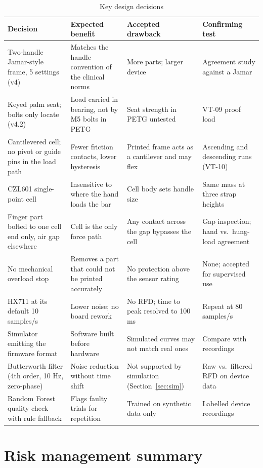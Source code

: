 \documentclass[10pt,a4paper]{article}
\begin{document}
\begin{table}[H]
\centering\small
\caption{Key design decisions}
\begin{tabularx}{\linewidth}{@{}P{3.9cm}LLP{3.3cm}@{}}
\toprule
Decision & Expected benefit & Accepted drawback & Confirming test \\
\midrule
Two-handle Jamar-style frame, 5 settings (v4) & Matches the handle convention of the clinical norms & More parts; larger device & Agreement study against a Jamar \\
Keyed palm seat; bolts only locate (v4.2) & Load carried in bearing, not by M5 bolts in PETG & Seat strength in PETG untested & VT-09 proof load \\
Cantilevered cell; no pivot or guide pins in the load path & Fewer friction contacts, lower hysteresis & Printed frame acts as a cantilever and may flex & Ascending and descending runs (VT-10) \\
CZL601 single-point cell & Insensitive to where the hand loads the bar & Cell body sets handle size & Same mass at three strap heights \\
Finger part bolted to one cell end only, air gap elsewhere & Cell is the only force path & Any contact across the gap bypasses the cell & Gap inspection; hand vs.\ hung-load agreement \\
No mechanical overload stop & Removes a part that could not be printed accurately & No protection above the sensor rating & None; accepted for supervised use \\
HX711 at its default 10 samples/s & Lower noise; no board rework & No RFD; time to peak resolved to 100 ms & Repeat at 80 samples/s \\
Simulator emitting the firmware format & Software built before hardware & Simulated curves may not match real ones & Compare with recordings \\
Butterworth filter (4th order, 10 Hz, zero-phase) & Noise reduction without time shift & Not supported by simulation (Section~\ref{sec:sim}) & Raw vs.\ filtered RFD on device data \\
Random Forest quality check with rule fallback & Flags faulty trials for repetition & Trained on synthetic data only & Labelled device recordings \\
\bottomrule
\end{tabularx}
\end{table}

\section{Risk management summary}\label{sec:risk}
\end{document}
